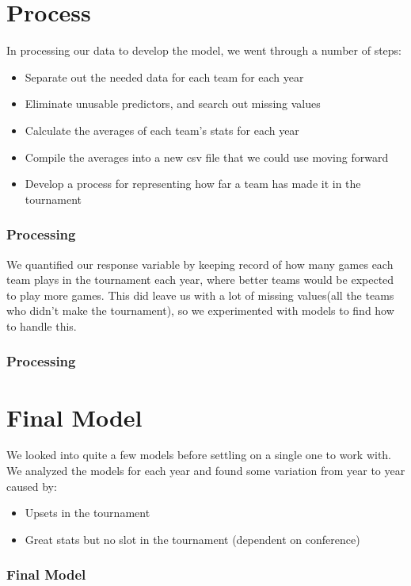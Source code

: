 \documentclass[11pt]{beamer}
\begin{document}
\section{Process}
\begin{frame}
In processing our data to develop the model, we went through a number of steps:
\begin{itemize}
	\footnotesize
	\item Separate out the needed data for each team for each year
	\item Eliminate unusable predictors, and search out missing values
	\item Calculate the averages of each team's stats for each year
	\item Compile the averages into a new csv file that we could use moving forward
	\item Develop a process for representing how far a team has made it in the tournament
\end{itemize}
\frametitle{{\textbf{\huge Processing}}}
\end{frame}
\begin{frame}
\center We quantified our response variable by keeping record of how many games each team plays in the tournament each year, where better teams would be expected to play more games. This did leave us with a lot of missing values(all the teams who didn't make the tournament), so we experimented with models to find how to handle this.
\frametitle{{\textbf{\huge Processing}}}
\end{frame}
\section{Final Model}
\begin{frame}
We looked into quite a few models before settling on a single one to work with. We analyzed the models for each year and found some variation from year to year caused by:
\footnotesize
\begin{itemize}
	\item Upsets in the tournament
	\item Great stats but no slot in the tournament (dependent on conference)
\end{itemize}
\frametitle{{\textbf{\huge Final Model}}}
\end{frame}
\end{document}
